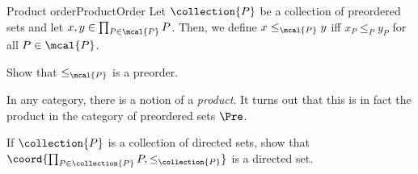 \begin{dfn}{Product order}{ProductOrder}
Let $\collection{P}$ be a collection of preordered sets and let $x,y\in \prod _{P\in \mcal{P}}P$.  Then, we define $x\leq _{\mcal{P}}y$ iff $x_P\leq _Py_P$ for all $P\in \mcal{P}$.
\begin{exr}[breakable=false]{}{}
Show that $\leq _{\mcal{P}}$ is a preorder.
\end{exr}
\begin{rmk}
In any category, there is a notion of a \emph{product}.  It turns out that this is in fact the product in the category of preordered sets $\Pre$.
\end{rmk}
\end{dfn}
\begin{exr}{}{}
If $\collection{P}$ is a collection of directed sets, show that $\coord{\prod _{P\in \collection{P}}P,\leq _{\collection{P}}}$ is a directed set.
\end{exr}
